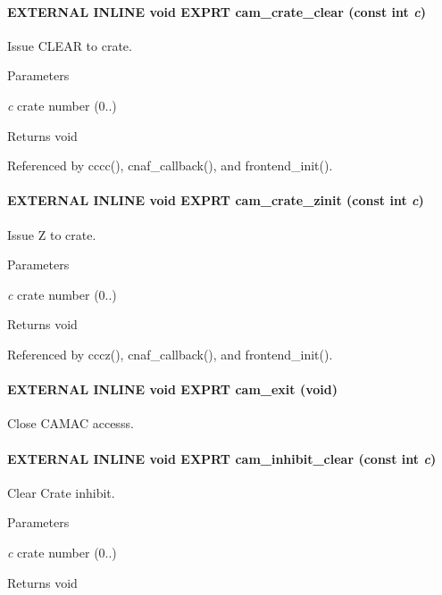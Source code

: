 \paragraph[{cam\_\-crate\_\-clear}]{\setlength{\rightskip}{0pt plus 5cm}EXTERNAL INLINE void EXPRT cam\_\-crate\_\-clear (const int {\em c})}\hfill\label{group__mcstdfunctionh_ga9fb70c7c5fb16d3807373902b137fe3e}
Issue CLEAR to crate. 
\begin{DoxyParams}{Parameters}
\item[{\em c}]crate number (0..) \end{DoxyParams}
\begin{DoxyReturn}{Returns}
void 
\end{DoxyReturn}


Referenced by cccc(), cnaf\_\-callback(), and frontend\_\-init().
\paragraph[{cam\_\-crate\_\-zinit}]{\setlength{\rightskip}{0pt plus 5cm}EXTERNAL INLINE void EXPRT cam\_\-crate\_\-zinit (const int {\em c})}\hfill\label{group__mcstdfunctionh_ga476ffc902c4674e17aa3b544781023e4}
Issue Z to crate. 
\begin{DoxyParams}{Parameters}
\item[{\em c}]crate number (0..) \end{DoxyParams}
\begin{DoxyReturn}{Returns}
void 
\end{DoxyReturn}


Referenced by cccz(), cnaf\_\-callback(), and frontend\_\-init().
\paragraph[{cam\_\-exit}]{\setlength{\rightskip}{0pt plus 5cm}EXTERNAL INLINE void EXPRT cam\_\-exit (void)}\hfill\label{group__mcstdfunctionh_ga115c540e273dd1e07d72fe82da4ba98d}
Close CAMAC accesss. 
\paragraph[{cam\_\-inhibit\_\-clear}]{\setlength{\rightskip}{0pt plus 5cm}EXTERNAL INLINE void EXPRT cam\_\-inhibit\_\-clear (const int {\em c})}\hfill\label{group__mcstdfunctionh_gaaf50e8892fd5226754befa7185c9dc3a}
Clear Crate inhibit. 
\begin{DoxyParams}{Parameters}
\item[{\em c}]crate number (0..) \end{DoxyParams}
\begin{DoxyReturn}{Returns}
void 
\end{DoxyReturn}


